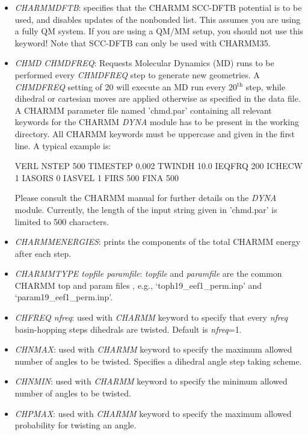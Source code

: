 \documentclass[12pt,a4paper,dvips]{article}
\begin{document}
\begin{itemize}
\item {\it CHARMMDFTB\/}: specifies that the CHARMM SCC-DFTB potential is to be used, and 
disables updates of the nonbonded list. This assumes you are using a fully QM system. If you
are using a QM/MM setup, you should not use this keyword! Note that SCC-DFTB can only be used 
with CHARMM35.  

\item {\it CHMD CHMDFREQ\/}: Requests Molecular Dynamics (MD) runs to be performed every {\it CHMDFREQ} step to generate new geometries. A {\it CHMDFREQ} setting of 20 will execute an MD run every 20$^\mathrm{th}$ step, while dihedral or cartesian moves are applied otherwise as specified in the data file. A CHARMM parameter file named 'chmd.par' containing all relevant keywords for the CHARMM {\it DYNA} module has to be present in the working directory. All CHARMM keywords must be uppercase and given in the first line. A typical example is:

VERL NSTEP 500 TIMESTEP 0.002 TWINDH 10.0 IEQFRQ 200 ICHECW 1 IASORS 0 IASVEL 1 FIRS 500 FINA 500 

Please consult the CHARMM manual for further details on the {\it DYNA} module. Currently, the length of the input string given in 'chmd.par' is limited to 500 characters.

\item{\it CHARMMENERGIES}: prints the components of the total CHARMM energy after each step.

\item {\it CHARMMTYPE topfile paramfile\/}:  {\it topfile} and {\it paramfile} are the
common CHARMM top and param files , e.g., `toph19\_eef1\_perm.inp' and `param19\_eef1\_perm.inp'.

\item{\it CHFREQ nfreq}: used with {\it CHARMM} keyword to specify that every
{\it nfreq} basin-hopping steps dihedrals are twisted. Default is {\it nfreq}=1.

\item{\it CHNMAX}: used with {\it CHARMM} keyword to specify the maximum allowed
number of angles to be twisted. Specifies a dihedral angle step taking scheme. 

\item{\it CHNMIN}: used with {\it CHARMM} keyword to specify the minimum allowed
number of angles to be twisted.

\item{\it CHPMAX}: used with {\it CHARMM} keyword to specify the maximum allowed
probability for twisting an angle.


\end{itemize}
\end{document}
